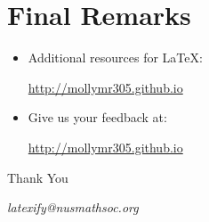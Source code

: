 \documentclass{beamer}
\begin{document}
    \section{Final Remarks}
    \begin{frame}
        \begin{itemize}
            \item Additional resources for \LaTeX{}:
            \begin{center}
                \url{http://mollymr305.github.io}
            \end{center}
            \item Give us your feedback at:
            \begin{center}
                \url{http://mollymr305.github.io}
            \end{center}
        \end{itemize}
    \end{frame}

    \begin{frame}
        \Huge{\centerline{Thank You}}
        \begin{center}
            \begin{normalsize}
                \emph{latexify@nusmathsoc.org}
            \end{normalsize}
        \end{center}
    \end{frame}
\end{document}
